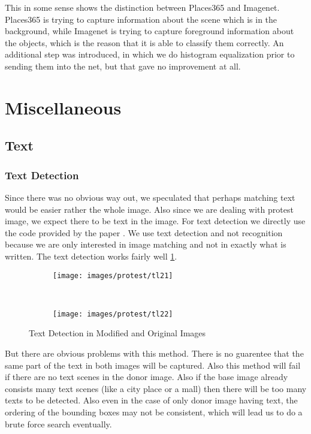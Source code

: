 \documentclass{article}
\begin{document}
This in some sense shows the distinction between Places365 and Imagenet. Places365 is trying to capture information about the scene which is in the background, while Imagenet is trying to capture foreground information about the objects, which is the reason that it is able to classify them correctly. An additional step was introduced, in which we do histogram equalization prior to sending them into the net, but that gave no improvement at all.
\section{Miscellaneous}
\subsection{Text}
\subsubsection{Text Detection}
Since there was no obvious way out, we speculated that perhaps matching text would be easier rather the whole image. Also since we are dealing with protest image, we expect there to be text in the image. For text detection we directly use the code provided by the paper \cite{DBLP:journals/corr/TianHHH016}. We use text detection and not recognition because we are only interested in image matching and not in exactly what is written. The text detection works fairly well \ref{fig:pr_imgs}.

\begin{figure}[H]
  \centering
  \begin{subfigure}[H]{0.4\linewidth}
    \texttt{[image: images/protest/tl21]}
  \end{subfigure}
  ~
  \begin{subfigure}[H]{0.4\linewidth}
    \texttt{[image: images/protest/tl22]}
  \end{subfigure}
  \caption{Text Detection in Modified and Original Images}
  \label{fig:pr_imgs}
\end{figure}

But there are obvious problems with this method. There is no guarentee that the same part of the text in both images will be captured. Also this method will fail if there are no text scenes in the donor image. Also if the base image already consists many text scenes (like a city place or a mall) then there will be too many texts to be detected. Also even in the case of only donor image having text, the ordering of the bounding boxes may not be consistent, which will lead us to do a brute force search eventually.
\end{document}
